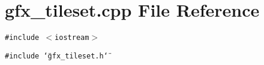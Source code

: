 \section{gfx\_\-tileset.cpp File Reference}
\label{gfx__tileset_8cpp}
{\tt \#include $<$iostream$>$}\par
{\tt \#include \char`\"{}gfx\_\-tileset.h\char`\"{}}\par
